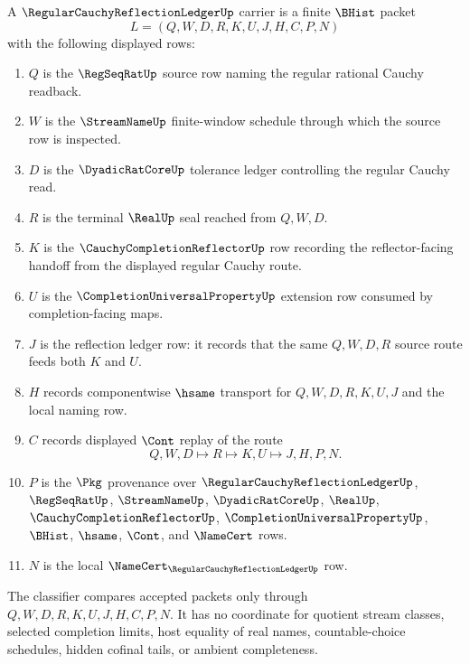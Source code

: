\begin{definition}
\label{def:cauchy-completion-reflection-ledger-carrier}
A $\RegularCauchyReflectionLedgerUp$ carrier is a finite $\BHist$ packet
$$
L=(Q,W,D,R,K,U,J,H,C,P,N)
$$
with the following displayed rows:
\begin{enumerate}
\item $Q$ is the $\RegSeqRatUp$ source row naming the regular rational Cauchy readback.
\item $W$ is the $\StreamNameUp$ finite-window schedule through which the source row is inspected.
\item $D$ is the $\DyadicRatCoreUp$ tolerance ledger controlling the regular Cauchy read.
\item $R$ is the terminal $\RealUp$ seal reached from $Q,W,D$.
\item $K$ is the $\CauchyCompletionReflectorUp$ row recording the reflector-facing handoff from the displayed regular Cauchy route.
\item $U$ is the $\CompletionUniversalPropertyUp$ extension row consumed by completion-facing maps.
\item $J$ is the reflection ledger row: it records that the same $Q,W,D,R$ source route feeds both $K$ and $U$.
\item $H$ records componentwise $\hsame$ transport for $Q,W,D,R,K,U,J$ and the local naming row.
\item $C$ records displayed $\Cont$ replay of the route
$$
Q,W,D \longmapsto R \longmapsto K,U \longmapsto J,H,P,N .
$$
\item $P$ is the $\Pkg$ provenance over $\RegularCauchyReflectionLedgerUp$, $\RegSeqRatUp$, $\StreamNameUp$, $\DyadicRatCoreUp$, $\RealUp$, $\CauchyCompletionReflectorUp$, $\CompletionUniversalPropertyUp$, $\BHist$, $\hsame$, $\Cont$, and $\NameCert$ rows.
\item $N$ is the local $\NameCert_{\RegularCauchyReflectionLedgerUp}$ row.
\end{enumerate}
The classifier compares accepted packets only through $Q,W,D,R,K,U,J,H,C,P,N$. It has no coordinate for quotient stream classes, selected completion limits, host equality of real names, countable-choice schedules, hidden cofinal tails, or ambient completeness.
\end{definition}

